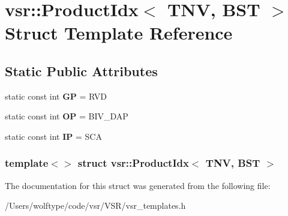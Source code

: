 \hypertarget{structvsr_1_1_product_idx_3_01_t_n_v_00_01_b_s_t_01_4}{\section{vsr\-:\-:Product\-Idx$<$ T\-N\-V, B\-S\-T $>$ Struct Template Reference}
\label{structvsr_1_1_product_idx_3_01_t_n_v_00_01_b_s_t_01_4}
}
\subsection*{Static Public Attributes}
\begin{DoxyCompactItemize}
\item 
\hypertarget{structvsr_1_1_product_idx_3_01_t_n_v_00_01_b_s_t_01_4_a18691037db3984ad12038e2c2ce6d451}{static const int {\bfseries G\-P} = R\-V\-D}\label{structvsr_1_1_product_idx_3_01_t_n_v_00_01_b_s_t_01_4_a18691037db3984ad12038e2c2ce6d451}

\item 
\hypertarget{structvsr_1_1_product_idx_3_01_t_n_v_00_01_b_s_t_01_4_aa9f5f66d79bdf4eed825929f8db3283a}{static const int {\bfseries O\-P} = B\-I\-V\-\_\-\-D\-A\-P}\label{structvsr_1_1_product_idx_3_01_t_n_v_00_01_b_s_t_01_4_aa9f5f66d79bdf4eed825929f8db3283a}

\item 
\hypertarget{structvsr_1_1_product_idx_3_01_t_n_v_00_01_b_s_t_01_4_a96950845a3b8c639d62bf1bd7ebc0d49}{static const int {\bfseries I\-P} = S\-C\-A}\label{structvsr_1_1_product_idx_3_01_t_n_v_00_01_b_s_t_01_4_a96950845a3b8c639d62bf1bd7ebc0d49}

\end{DoxyCompactItemize}
\subsubsection*{template$<$$>$ struct vsr\-::\-Product\-Idx$<$ T\-N\-V, B\-S\-T $>$}



The documentation for this struct was generated from the following file\-:\begin{DoxyCompactItemize}
\item 
/\-Users/wolftype/code/vsr/\-V\-S\-R/vsr\-\_\-templates.\-h\end{DoxyCompactItemize}
